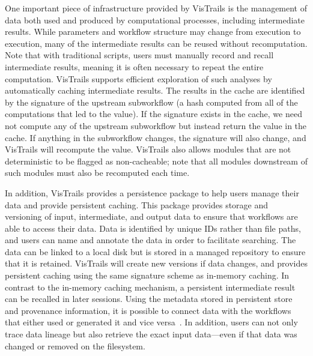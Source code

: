 \documentclass[12pt]{iopart}
\begin{document}

One important piece of infrastructure provided by VisTrails is the
management of data both used and produced by computational processes,
including intermediate results. While parameters and workflow
structure may change from execution to execution, many of the
intermediate results can be reused without recomputation. Note that
with traditional scripts, users must manually record and recall
intermediate results, meaning it is often necessary to repeat the
entire computation. VisTrails supports efficient exploration of such
analyses by automatically caching intermediate results. The results
in the cache are identified by the signature of the upstream
subworkflow (a hash computed from all of the computations that led to
the value). If the signature exists in the cache, we need not compute
any of the upstream subworkflow but instead return the value in the
cache. If anything in the subworkflow changes, the signature will
also change, and VisTrails will recompute the value. VisTrails also
allows modules that are not deterministic to be flagged as
non-cacheable; note that all modules downstream of such modules must
also be recomputed each time.

In addition, VisTrails provides a persistence package to help users
manage their data and provide persistent caching. This package
provides storage and versioning of input, intermediate, and output
data to ensure that workflows are able to access their data. Data is
identified by unique IDs rather than file paths, and users can name
and annotate the data in order to facilitate searching. The data can
be linked to a local disk but is stored in a managed repository to
ensure that it is retained. VisTrails will create new versions if
data changes, and provides persistent caching using the same signature
scheme as in-memory caching. In contrast to the in-memory caching
mechanism, a persistent intermediate result can be recalled in later
sessions. Using the metadata stored in persistent store and
provenance information, it is possible to connect data with the
workflows that either used or generated it and vice
versa~\cite{koop@ssdbm2010}. In addition, users can not only trace
data lineage but also retrieve the exact input data---even if that
data was changed or removed on the filesystem.
\end{document}
